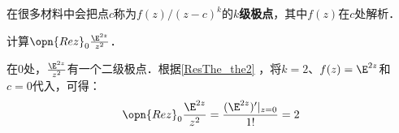 在很多材料中会把点$c$称为$f(z)/(z-c)^k$的$k$\textbf{级极点}，其中$f(z)$在$c$处解析．

\begin{example}{}
计算$\opn{Rez}_0 \frac{\E^{2z}}{z^2}$．

在$0$处，$\frac{\E^{2z}}{z^2}$有一个二级极点．根据\autoref{ResThe_the2} ，将$k=2$、$f(z)=\E^{2z}$和$c=0$代入，可得：
\begin{equation}
\opn{Rez}_0\frac{\E^{2z}}{z^2}=\frac{(\E^{2z})'|_{z=0}}{1!}=2
\end{equation}


\end{example}












